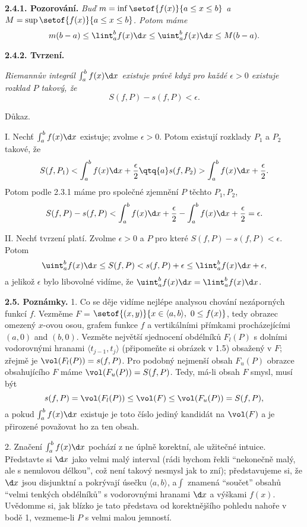 \documentclass[12pt]{article}
\begin{document}
{  \medskip
  
  {\bf 2.4.1. Pozorování.} {\em Buď $m=\inf\setof{f(x)}{a\leq x\leq b}$ a
  $M=\sup\setof{f(x)}{a\leq x\leq b}$. Potom máme
  $$
  m(b-a)\leq \lint_a^bf(x)\d x\leq \uint_a^bf(x)\d x\leq M(b-a).
  $$}
  
  \medskip
  
  {\bf 2.4.2. Tvrzení.} {\em Riemannův integrál $\int_a^bf(x)\d x$ existuje právě když pro každé $\epsilon >0$ existuje rozklad  $P$ takový, že
  $$
  S(f,P)-s(f,P)<\epsilon.
  $$
 
 Důkaz.} I. Nechť $ \int_a^bf(x)\d x$ existuje; zvolme $\epsilon>0$. Potom existují rozklady $P_1$ a $P_2$ takové, že
 $$
 S(f,P_1)<  \int_a^bf(x)\d x+\frac{\epsilon}{2} \qtq{a} s(f,P_2)>  \int_a^bf(x)\d x+\frac{\epsilon}{2}.
 $$
 Potom podle  2.3.1 máme pro společné zjemnění $P$ těchto $P_1,P_2$,
 $$
 S(f,P)-s(f,P)<\int_a^bf(x)\d x+\frac{\epsilon}{2}- \int_a^bf(x)\d x+\frac{\epsilon}{2}=\epsilon.
 $$
 
 \smallskip
 
 II. Nechť tvrzení platí. Zvolme $\epsilon>0$  a $P$ pro které $S(f,P)-s(f,P)<\epsilon$. Potom
 $$
  \uint_a^bf(x)\d x\leq S(f,P)<s(f,P)+\epsilon\leq \lint_a^bf(x)\d x +\epsilon,
 $$
a jelikož $\epsilon$ bylo libovolné vidíme, že $\uint_a^bf(x)\d x= \lint_a^bf(x)\d x$.\sq
 
 \bigskip
 
 {\bf 2.5. Poznámky.} 1. Co se děje vidíme nejlépe analysou chování nezáporných funkcí $f$. Vezměme
 $F$ = $\setof{(x,y)}{x\in\langle a,b\rangle,\ 0\leq f(x)}$, tedy obrazec omezený $x$-ovou osou, grafem funkce $f$ a vertikálními přímkami procházejícími $(a,0)$ and $(b,0)$. Vezměte největší sjednocení obdélníků $F_l(P)$
s dolními vodorovnými hranami  $\langle t_{j-1},t_j\rangle$ (připomeňte si obrázek v  1.5) obsažený v
 $F$; zřejmě je $\vol(F_l(P))=s(f,P)$. Pro podobný nejmenší  obsah $F_u(P)$ obrazce obsahujícího $F$ máme
 $\vol(F_u(P))=S(f,P)$. Tedy, má-li obsah  $F$ smysl, musí být
 $$
 s(f,P)=\vol(F_l(P))\leq\vol(F)\leq\vol(F_u(P))=S(f,P),
 $$
a pokud $\int_a^bf(x)\d x$ existuje  je toto číslo jediný kandidát na $\vol(F)$ a je přirozené považovat ho za
ten obsah.
 
 \smallskip
 
 2. Značení $\int_a^bf(x)\d x$ pochází z ne úplně korektní, ale užitečné intuice. Představte si $\d x$ jako velmi malý interval (rádi bychom řekli ``nekonečně malý, ale s nenulovou délkou'', což není takový nesmysl jak to zní); představujeme si, že  $\d x$ jsou disjunktní a pokrývají úsečku $\langle a,b\rangle$, a$\int$ znamená  ``součet'' obsahů  ``velmi tenkých obdélníků'' s vodorovnými hranami $\d x$ a výškami $f(x)$. Uvědomme si, jak  blízko je tato představa od korektnějšího pohledu nahoře v bodě 1, vezmeme-li 
  $P$ s velmi malou jemností.
 
}
\end{document}
